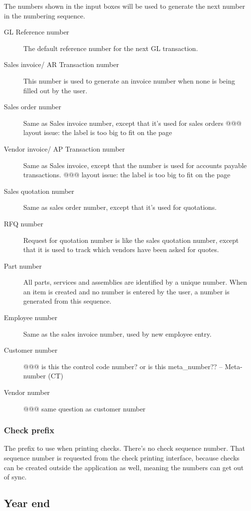 The numbers shown in the input boxes will be used to generate the next number in the
numbering sequence.

\begin{description}
\item [GL Reference number] The default reference number for the next GL transaction.
\item [Sales invoice/ AR Transaction number] This number is used to generate an invoice
number when none is being filled out by the user.
\item [Sales order number ] Same as Sales invoice number, except that it's used for sales orders @@@ layout issue: the label is too big to fit on the page
\item [Vendor invoice/ AP Transaction number] Same as Sales invoice, except that the number
is used for accounts payable transactions. @@@ layout issue: the label is too big to fit on the page 
\item [Sales quotation number] Same as sales order number, except that it's used for quotations.
\item [RFQ number] Request for quotation number is like the sales quotation number, except
that it is used to track which vendors have been asked for quotes.
\item [Part number] All parts, services and assemblies are identified by a unique number.
When an item is created and no number is entered by the user, a number is generated
from this sequence.
\item [Employee number ] Same as the sales invoice number, used by new employee entry.
\item [Customer number] @@@ is this the control code number? or is this
meta\_number?? -- Meta-number (CT) 
\item [Vendor number] @@@ same question as customer number
\end{description}

\subsubsection{Check prefix}
\label{subsubsec-company-config-defaults-check-prefix}

 The prefix to use when printing checks. There's no check sequence number. That sequence number is requested from the check printing interface, because
checks can be created outside the application as well, meaning the numbers can
get out of sync.

\subsection{Year end}
\label{subsec-company-config-year-end}

